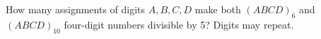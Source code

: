 How many assignments of digits $A,B,C,D$ make both $(ABCD)_6$ and $(ABCD)_{10}$ four-digit numbers divisible by 5? Digits may repeat.
